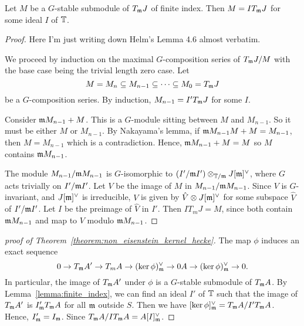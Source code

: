 \documentclass{article}
\begin{document}
\begin{lemma}\label{lemma:finite_index}
    Let $M$ be a $G$-stable submodule of $T_{\mathfrak{m}} J$ of finite index. Then
    $M=IT_{\mathfrak{m}} J$ for some ideal $I$ of $\mathbb{T}$.
\end{lemma}
\begin{proof}
    Here I'm just writing down Helm's Lemma 4.6 almost verbatim.

    We proceed by induction on the maximal $G$-composition series of $T_{\mathfrak{m}} J/M$
    with the base case being the trivial length zero case. Let 
    \[
        M = M_n \subseteq M_{n-1} \subseteq \cdots \subseteq M_0 = T_{\mathfrak{m}} J
    \]
    be a $G$-composition series. By induction, $M_{n-1} = I'T_{\mathfrak{m}} J$ for some
    $I$.

    Consider $\mathfrak{m} M_{n-1} + M$. This is a $G$-module sitting between $M$ and
    $M_{n-1}$. So it must be either $M$ or $M_{n-1}$. By Nakayama's lemma, if
    $\mathfrak{m} M_{n-1} M + M = M_{n-1}$, then $M=M_{n-1}$ which is a contradiction.
    Hence, $\mathfrak{m} M_{n-1}+M=M$ so $M$ contains $\mathfrak{m} M_{n-1}$.

    The module $M_{n-1}/\mathfrak{m} M_{n-1}$ is $G$-isomorphic to $(I'/\mathfrak{m} I')\otimes_{\mathbb{T}/\mathfrak{m}}
    J[\mathfrak{m}]^\vee$, where $G$ acts trivially on $I'/\mathfrak{m} I'$. Let $V$ be the image
    of $M$ in $M_{n-1}/\mathfrak{m} M_{n-1}$. Since $V$ is $G$-invariant, and
    $J[\mathfrak{m}]^\vee$ is irreducible, $V$ is given by $\hat{V}\otimes J[\mathfrak{m}]^\vee$
    for some subspace $\hat{V}$ of $I'/\mathfrak{m} I'$. Let $I$ be the preimage of
    $\hat{V}$ in $I'$. Then $IT_m J = M$, since both contain $\mathfrak{m} M_{n-1}$ and
    map to $V$ modulo $\mathfrak{m} M_{n-1}$.
\end{proof}

\begin{proof}[proof of Theorem~\ref{theorem:non_eisenstein_kernel_hecke}]
    The map $\phi$ induces an exact sequence
    \[
        0 \to T_{\mathfrak{m}} A' \to T_m A \to (\ker \phi)^\vee _{\mathfrak{m}} 
        \to 0 A \to (\ker \phi)^\vee _{\mathfrak{m}} \to 0.
    \]
    In particular, the image of $T_{\mathfrak{m}} A'$ under $\phi$ is a $G$-stable
    submodule of $T_{\mathfrak{m}} A$. By Lemma~\ref{lemma:finite_index}, we can find an
    ideal $I'$ of $\mathbb{T}$ such that the image of $T_{\mathfrak{m}} A'$ is $I' _{\mathfrak{m}} T_{\mathfrak{m}} A$ for
    all $\mathfrak{m}$ outside $S$. Then we have $[\ker \phi]^\vee _{\mathfrak{m}} = T_{\mathfrak{m}} A / I' T_{\mathfrak{m}}
    A$. Hence, $I' _{\mathfrak{m}} = I_{\mathfrak{m}}$. Since $T_{\mathfrak{m}} A/IT_{\mathfrak{m}} A= A[I]_{\mathfrak{m}} ^\vee$.
\end{proof}



\end{document}
